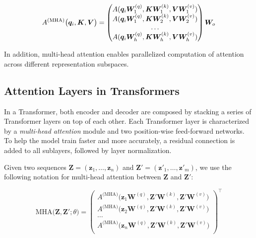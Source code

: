\begin{equation}
    A^{\textrm{(MHA)}}\bigl(\bm{q}_i, \bm{K}, \bm{V}\bigr) = 
    \begin{pmatrix}
        A(\bm{q}_i \bm{W}^{(q)}_1, \bm{K}\bm{W}^{(k)}_1, \bm{V}\bm{W}^{(v)}_1) \\
        A(\bm{q}_i \bm{W}^{(q)}_1, \bm{K}\bm{W}^{(k)}_2, \bm{V}\bm{W}^{(v)}_2) \\
        \ldots \\
        A(\bm{q}_i \bm{W}^{(q)}_h, \bm{K}\bm{W}^{(k)}_h, \bm{V}\bm{W}^{(v)}_h)
    \end{pmatrix}
    \bm{W}_o \\
\end{equation}
    

\noindent In addition, multi-head attention enables parallelized computation of attention across different representation subspaces.

 
\subsection{Attention Layers in Transformers}

In a Transformer, both encoder and decoder are composed by stacking a series of Transformer layers on top of each other. Each Transformer layer is characterized by a \textit{multi-head attention} module and two position-wise feed-forward networks. To help the model train faster and more accurately, a residual connection \citep{he2016deep} is added to all sublayers, followed by layer normalization.

Given two sequences $\bm{Z} = (\bm{z}_1, \ldots, \bm{z}_n)$ and $\bm{Z'} = (\bm{z'}_1, \ldots, \bm{z'}_m)$, we use the following notation for multi-head attention between $\bm{Z}$ and $\bm{Z'}$:

\begin{equation}
    \textrm{MHA}\bigl(\bm{Z}, \bm{Z'}; \theta\bigr) = 
    {\begin{pmatrix}
    A^{\textrm{(MHA)}}\bigl(\bm{z}_1 \bm{W}^{(q)}, \bm{Z'}\bm{W}^{(k)}, \bm{Z}'\bm{W}^{(v)}\bigr)\\ 
    A^{\textrm{(MHA)}}\bigl(\bm{z}_2 \bm{W}^{(q)}, \bm{Z'}\bm{W}^{(k)}, \bm{Z}'\bm{W}^{(v)}\bigr)\\ 
    \ldots \\
    A^{\textrm{(MHA)}}\bigl(\bm{z}_n \bm{W}^{(q)}, \bm{Z'}\bm{W}^{(k)}, \bm{Z}'\bm{W}^{(v)}\bigr) \\
    \end{pmatrix}}^{\top}
\end{equation}

